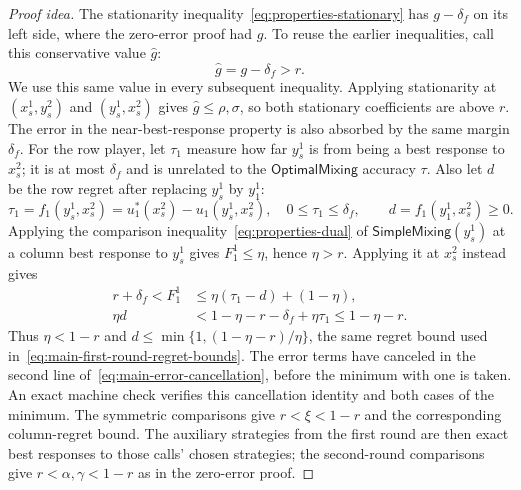 \documentclass[11pt]{article}
\theoremstyle{remark}
\theoremstyle{plain}
\newcommand{\sm}{\mathsf{SimpleMixing}}
\newcommand{\om}{\mathsf{OptimalMixing}}
\begin{document}
\begin{proof}[Proof idea]
The stationarity inequality~\eqref{eq:properties-stationary} has
$g-\delta_f$ on its left side, where the zero-error proof had $g$.
To reuse the earlier inequalities, call this
conservative value $\hat g$:
\begin{equation}
 \hat g=g-\delta_f>r.
 \label{eq:main-error-stationary-value}
\end{equation}
We use this same value in every subsequent inequality. Applying
stationarity at $(x_s^1,y_s^2)$ and
$(y_s^1,x_s^2)$ gives $\hat g\le\rho,\sigma$, so both stationary
coefficients are above $r$.
The error in the near-best-response property is also absorbed by
the same margin $\delta_f$.
For the row player, let $\tau_1$ measure how far $y_s^1$ is from
being a best response to $x_s^2$; it is at most $\delta_f$ and is
unrelated to the $\om$ accuracy $\tau$. Also let $d$ be the row
regret after replacing $y_s^1$ by $y_1^1$:
\begin{equation}
 \tau_1=f_1(y_s^1,x_s^2)=u_1^*(x_s^2)-u_1(y_s^1,x_s^2),\quad
 0\le\tau_1\le\delta_f,\qquad d=f_1(y_1^1,x_s^2)\ge0.
 \label{eq:main-error-row-shortfall}
\end{equation}
Applying the comparison inequality~\eqref{eq:properties-dual} of
$\sm(y_s^1)$ at a column best response to $y_s^1$ gives
$F_1^1\le\eta$, hence $\eta>r$.
Applying it at $x_s^2$ instead gives
\begin{equation}
 \begin{aligned}
 r+\delta_f<F_1^1&\le\eta(\tau_1-d)+(1-\eta),\\
 \eta d&<1-\eta-r-\delta_f+\eta\tau_1\le1-\eta-r.
 \end{aligned}
 \label{eq:main-error-cancellation}
\end{equation}
Thus $\eta<1-r$ and
$d\le\min\{1,(1-\eta-r)/\eta\}$, the same regret bound used
in~\eqref{eq:main-first-round-regret-bounds}.
The error terms have canceled in the second line
of~\eqref{eq:main-error-cancellation}, before the minimum with one
is taken. An exact machine check verifies this cancellation identity
and both cases of the minimum.
The symmetric comparisons give $r<\xi<1-r$ and the corresponding
column-regret bound. The auxiliary strategies from the first round
are then exact best responses to those calls' chosen strategies;
the second-round comparisons give $r<\alpha,\gamma<1-r$ as in the
zero-error proof.


\end{proof}
\end{document}
